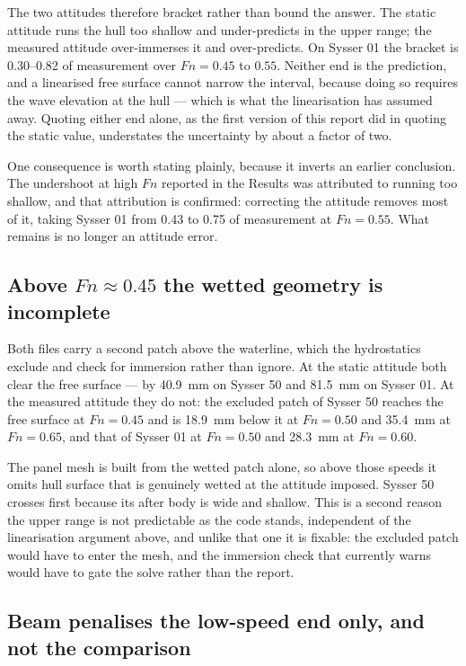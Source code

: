 \documentclass[11pt]{article}
\newcommand{\Fn}{\mathit{Fn}}
\begin{document}
The two attitudes therefore bracket rather than bound the answer. The static attitude runs the
hull too shallow and under-predicts in the upper range; the measured attitude over-immerses it
and over-predicts. On Sysser 01 the bracket is \numrange{0.30}{0.82} of measurement over $\Fn = 0.45$ to $0.55$. Neither end is the prediction, and a
linearised free surface cannot narrow the interval, because doing so requires the wave
elevation at the hull --- which is what the linearisation has assumed away. Quoting either end
alone, as the first version of this report did in quoting the static value, understates the
uncertainty by about a factor of two.

One consequence is worth stating plainly, because it inverts an earlier conclusion. The
undershoot at high $\Fn$ reported in the Results was attributed to running too shallow, and
that attribution is confirmed: correcting the attitude removes most of it,
taking Sysser 01 from \num{0.43} to \num{0.75} of measurement at $\Fn = 0.55$. What remains is no longer an
attitude error.

\subsection{Above \texorpdfstring{$\Fn \approx 0.45$}{Fn = 0.45} the wetted geometry is incomplete}

Both files carry a second patch above the waterline, which the hydrostatics exclude and check
for immersion rather than ignore. At the static attitude both clear the free surface --- by
\SI{40.9}{\milli\metre} on Sysser 50 and \SI{81.5}{\milli\metre} on Sysser 01. At the
measured attitude they do not: the excluded patch of Sysser 50 reaches the free surface at
$\Fn = 0.45$ and is \SI{18.9}{\milli\metre} below it at $\Fn = 0.50$ and
\SI{35.4}{\milli\metre} at $\Fn = 0.65$, and that of Sysser 01 at $\Fn = 0.50$ and
\SI{28.3}{\milli\metre} at $\Fn = 0.60$.

The panel mesh is built from the wetted patch alone, so above those speeds it omits hull
surface that is genuinely wetted at the attitude imposed. Sysser 50 crosses first because its
after body is wide and shallow. This is a second reason the upper range is not predictable as
the code stands, independent of the linearisation argument above, and unlike that one it is
fixable: the excluded patch would have to enter the mesh, and the immersion check that
currently warns would have to gate the solve rather than the report.

\subsection{Beam penalises the low-speed end only, and not the comparison}
\end{document}
